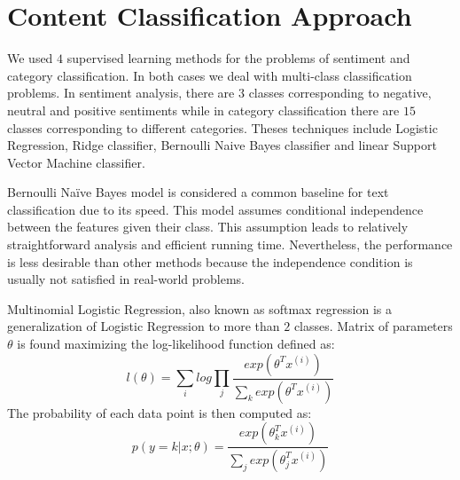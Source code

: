 \section{Content Classification Approach}
\label{sec:approach}
We used $4$ supervised learning methods for the problems of sentiment and category classification.
In both cases we deal with multi-class classification problems. In sentiment analysis, there are $3$ classes corresponding to negative, neutral and positive sentiments while in category classification there are $15$ classes corresponding to different categories.
Theses techniques include Logistic Regression, Ridge classifier, Bernoulli Naive Bayes classifier and linear Support Vector Machine classifier.

Bernoulli Naïve Bayes model is considered a common baseline for text classification due to its speed.
This model assumes conditional independence between the features given their class. This assumption leads to relatively straightforward analysis and efficient running time. Nevertheless, the performance is less desirable than other methods because the independence condition is usually not satisfied in real-world problems.

%
%

Multinomial Logistic Regression, also known as softmax regression is a generalization of Logistic Regression to more than $2$ classes.
Matrix of parameters $\theta$ is found maximizing the log-likelihood function defined as:
\begin{equation}
	l(\theta) = \sum_i log \prod_j \frac{exp(\theta^Tx^{(i)})}{\sum_k exp(\theta^Tx^{(i)})}
\label{eq:softmax-likelihood}
\end{equation}
The probability of each data point is then computed as:
\begin{equation}
 p(y=k|x;\theta)=\frac{exp(\theta^T_k x^{(i)})}{\sum_j exp(\theta_j^T x^{(i)})}
\label{eq:softmax-prob}
\end{equation}

